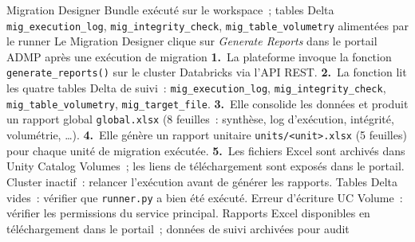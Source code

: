 \medskip

  {Migration Designer}
  {Bundle exécuté sur le workspace~; tables Delta \texttt{mig\_execution\_log}, \texttt{mig\_integrity\_check}, \texttt{mig\_table\_volumetry} alimentées par le runner}
  {Le Migration Designer clique sur \textit{Generate Reports} dans le portail ADMP après une exécution de migration}
  {\textbf{1.}~La plateforme invoque la fonction \texttt{generate\_reports()} sur le cluster Databricks via l'API REST.\newline
   \textbf{2.}~La fonction lit les quatre tables Delta de suivi~: \texttt{mig\_execution\_log}, \texttt{mig\_integrity\_check}, \texttt{mig\_table\_volumetry}, \texttt{mig\_target\_file}.\newline
   \textbf{3.}~Elle consolide les données et produit un rapport global \texttt{global.xlsx} (8 feuilles~: synthèse, log d'exécution, intégrité, volumétrie, \ldots).\newline
   \textbf{4.}~Elle génère un rapport unitaire \texttt{units/<unit>.xlsx} (5 feuilles) pour chaque unité de migration exécutée.\newline
   \textbf{5.}~Les fichiers Excel sont archivés dans Unity Catalog Volumes~; les liens de téléchargement sont exposés dans le portail.}
  {Cluster inactif~: relancer l'exécution avant de générer les rapports. Tables Delta vides~: vérifier que \texttt{runner.py} a bien été exécuté. Erreur d'écriture UC Volume~: vérifier les permissions du service principal.}
  {Rapports Excel disponibles en téléchargement dans le portail~; données de suivi archivées pour audit}

\medskip


